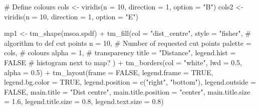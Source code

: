 \documentclass[
  letterpaper,
  DIV=11,
  numbers=noendperiod]{scrreprt}
\newenvironment{Shaded}{\begin{snugshade}}{\end{snugshade}}
\newcommand{\AttributeTok}[1]{\textcolor[rgb]{0.40,0.45,0.13}{#1}}
\newcommand{\CommentTok}[1]{\textcolor[rgb]{0.37,0.37,0.37}{#1}}
\newcommand{\ConstantTok}[1]{\textcolor[rgb]{0.56,0.35,0.01}{#1}}
\newcommand{\DecValTok}[1]{\textcolor[rgb]{0.68,0.00,0.00}{#1}}
\newcommand{\FloatTok}[1]{\textcolor[rgb]{0.68,0.00,0.00}{#1}}
\newcommand{\FunctionTok}[1]{\textcolor[rgb]{0.28,0.35,0.67}{#1}}
\newcommand{\NormalTok}[1]{\textcolor[rgb]{0.00,0.23,0.31}{#1}}
\newcommand{\OtherTok}[1]{\textcolor[rgb]{0.00,0.23,0.31}{#1}}
\newcommand{\SpecialCharTok}[1]{\textcolor[rgb]{0.37,0.37,0.37}{#1}}
\newcommand{\StringTok}[1]{\textcolor[rgb]{0.13,0.47,0.30}{#1}}
\begin{document}
\begin{Shaded}
\begin{Highlighting}[]
\CommentTok{\# Define colours}
\NormalTok{cols }\OtherTok{\textless{}{-}} \FunctionTok{viridis}\NormalTok{(}\AttributeTok{n =} \DecValTok{10}\NormalTok{, }\AttributeTok{direction =} \DecValTok{1}\NormalTok{, }\AttributeTok{option =} \StringTok{"B"}\NormalTok{)}
\NormalTok{cols2 }\OtherTok{\textless{}{-}} \FunctionTok{viridis}\NormalTok{(}\AttributeTok{n =} \DecValTok{10}\NormalTok{, }\AttributeTok{direction =} \DecValTok{1}\NormalTok{, }\AttributeTok{option =} \StringTok{"E"}\NormalTok{)}


\NormalTok{mp1 }\OtherTok{\textless{}{-}}  \FunctionTok{tm\_shape}\NormalTok{(msoa.spdf) }\SpecialCharTok{+} 
  \FunctionTok{tm\_fill}\NormalTok{(}\AttributeTok{col =} \StringTok{"dist\_centre"}\NormalTok{, }
          \AttributeTok{style =} \StringTok{"fisher"}\NormalTok{, }\CommentTok{\# algorithm to def cut points}
          \AttributeTok{n =} \DecValTok{10}\NormalTok{, }\CommentTok{\# Number of requested cut points}
          \AttributeTok{palette =}\NormalTok{ cols, }\CommentTok{\# colours}
          \AttributeTok{alpha =} \DecValTok{1}\NormalTok{, }\CommentTok{\# transparency }
          \AttributeTok{title =} \StringTok{"Distance"}\NormalTok{, }
          \AttributeTok{legend.hist =} \ConstantTok{FALSE} \CommentTok{\# histogram next to map?}
\NormalTok{          ) }\SpecialCharTok{+}
  \FunctionTok{tm\_borders}\NormalTok{(}\AttributeTok{col =} \StringTok{"white"}\NormalTok{, }\AttributeTok{lwd =} \FloatTok{0.5}\NormalTok{, }\AttributeTok{alpha =} \FloatTok{0.5}\NormalTok{) }\SpecialCharTok{+}
  \FunctionTok{tm\_layout}\NormalTok{(}\AttributeTok{frame =} \ConstantTok{FALSE}\NormalTok{,}
            \AttributeTok{legend.frame =} \ConstantTok{TRUE}\NormalTok{, }\AttributeTok{legend.bg.color =} \ConstantTok{TRUE}\NormalTok{,}
            \AttributeTok{legend.position =} \FunctionTok{c}\NormalTok{(}\StringTok{"right"}\NormalTok{, }\StringTok{"bottom"}\NormalTok{),}
            \AttributeTok{legend.outside =} \ConstantTok{FALSE}\NormalTok{,}
            \AttributeTok{main.title =} \StringTok{"Dist centre"}\NormalTok{, }
            \AttributeTok{main.title.position =} \StringTok{"center"}\NormalTok{,}
            \AttributeTok{main.title.size =} \FloatTok{1.6}\NormalTok{,}
            \AttributeTok{legend.title.size =} \FloatTok{0.8}\NormalTok{,}
            \AttributeTok{legend.text.size =} \FloatTok{0.8}\NormalTok{)}



\end{Highlighting}
\end{Shaded}
\end{document}
